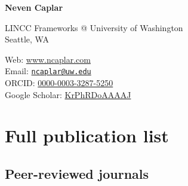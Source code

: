 \documentclass[11pt,letterpaper]{article}
\def\name{\textbf{Neven Caplar}}
\begin{document}
{\huge \name}


\bigskip

\begin{minipage}[t]{0.645\textwidth}
  LINCC Frameworks @ University of Washington\\
  Seattle, WA 
\end{minipage}
\begin{minipage}[t]{0.345\textwidth}
  Web: \href{https://www.ncaplar.com}{www.ncaplar.com} \\
  Email: \href{mailto:ncaplar@uw.edu}{\nolinkurl{ncaplar@uw.edu}} \\
  ORCID: \href{https://orcid.org/0000-0003-3287-5250}{0000-0003-3287-5250} \\
  Google Scholar:  \href{https://scholar.google.com/citations?hl=en&user=KrPhRDoAAAAJ}{KrPhRDoAAAAJ} 
\end{minipage}




\section*{Full publication list}


\subsection*{Peer-reviewed journals}
\end{document}
